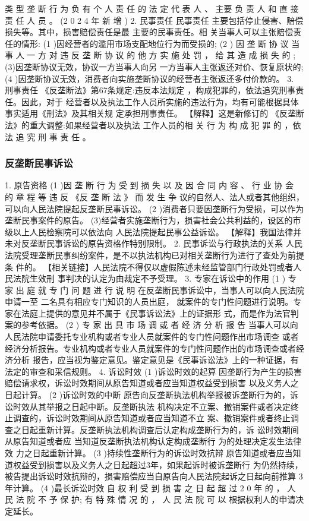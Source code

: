 \documentclass[UTF8,12pt]{ctexart}
\numberwithin{equation}{section} %
\numberwithin{figure}{section}
\numberwithin{table}{section}
\begin{document}
	类 型 垄 断 行 为 负 有 个 人 责 任 的 法 定 代 表 人 、 主要 负 责 人 和 直 接 责 任 人 员 。 (2 0 2 4 年 新 增 )
	2. 民事责任
	民事责任 主要包括停止侵害、赔偿损失等。其中，损害赔偿责任是最 主要的民事责任。相
	关当事人可以主张赔偿责任的情形:
	(1 )因经营者的滥用市场支配地位行为而受损的;
	(2 ) 因 垄 断 协 议 当 事 人 一 方 对 违 反 垄 断 协 议 的 他 方 实 施 处 罚 ， 给 其 造 成 损 失 的 ;
	(3)因垄断协议无效，协议一方当事人向另 一方当事人主张返还对价、恢复原状的;
	(4 )因垄断协议无效，消费者向实施垄断协议的经营者主张返还多付价款的。
	3. 刑事责任
	《反垄断法》第67条规定:违反本法规定 ，构成犯罪的，依法追究刑事责任。因此，对于
	经营者以及执法工作人员所实施的违法行为，均有可能根据具体事实适用《刑法》及其相关规
	定承担刑事责任。
	【解释】这是新修订的 《反垄断法》的重大调整:如果经营者以及执法 工作人员的相
	关 行 为 构 成 犯 罪 的 ，依 法 追 究 刑 事 责 任 。
	
	\subsubsection{反垄断民事诉讼}
	1. 原告资格
	(1 )因 垄 断 行 为 受 到 损 失 以 及 因 合 同 内 容 、 行 业 协 会 的 章 程 等 违 反 《反 垄 断 法 》 而 发 生 争
	议的自然人、法人或者其他组织，可以向人民法院提起反垄断民事诉讼。
	(2 )消费者只要因垄断行为受损，可以作为垄断民事案件的原告。
	(3)经营者实施垄断行为，损害社会公共利益的，设区的市级以上人民检察院可以依法向
	人民法院提起民事公益诉讼。
	【解释】我国法律并未对反垄断民事诉讼的原告资格作特别限制。
	2. 民事诉讼与行政执法的关系
	人民法院受理垄断民事纠纷案件，是不以执法机构已对相关垄断行为进行了查处为前提条
	件的。
	【相关链接】人民法院不得仅以虚假陈述未经监管部门行政处罚或者人民法院生效刑
	事判决的认定为由裁定不予受理。
	3. 专家在诉讼中的作用
	(1 ) 专 家 出 庭 就 专 门 问 题 进 行 说 明
	在反垄断民事诉讼中，当事人可以向人民法院申请一至 二名具有相应专门知识的人员出庭，
	就案件的专门性问题进行说明。专家在法庭上提供的意见并不属于《民事诉讼法》上的证据形
	式，而是作为法官判案的参考依据。
	(2 ) 专 家 出 具 市 场 调 或 者 经 济 分 析 报 告
	当事人可以向人民法院申请委托专业机构或者专业人员就案件的专门性问题作出市场调查
	或者经济分析报告。专业机构或者专业人员就案件的专门性问题作出的市场调查或者经济分析
	报告，应当视为鉴定意见。鉴定意见是《民事诉讼法》上的一种证据，有法定的审查和采信规则。
	4. 诉讼时效
	(1 )诉讼时效的起算
	因垄断行为产生的损害赔偿请求权，诉讼时效期间从原告知道或者应当知道权益受到损害
	以及义务人之日起计算。
	(2 )诉讼时效的中断
	原告向反垄断执法机构举报被诉垄断行为的，诉讼时效从其举报之日起中断。反垄断执法
	机构决定不立案、撤销案件或者决定终止调查的，诉讼时效期间从原告知道或者应当知道不立
	案、撤销案件或者终止调查之日起重新计算。反垄断执法机构调查后认定构成垄断行为的，诉
	讼时效期间从原告知道或者应 当知道反垄断执法机构认定构成垄断行 为的处理决定发生法律效
	力之日起重新计算。
	(3 )持续性垄断行为的诉讼时效抗辩
	原告知道或者应当知道权益受到损害以及义务人之日起超过3年，如果起诉时被诉垄断行
	为仍然持续，被告提出诉讼时效抗辩的，损害赔偿应当自原告向人民法院起诉之日起向前推算
	3年计算。
	(4 )最长诉讼时效
	自 权 利 受 到 损 害 之 日 起 超 过 2 0 年 的 ， 人 民 法 院 不 予 保 护; 有 特 殊 情 况 的 ， 人 民 法 院 可 以
	根据权利人的申请决定延长。
	
\end{document}
